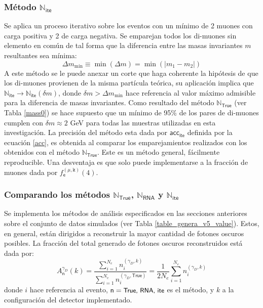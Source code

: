 \subsubsection{Método $\mathbb{N}_\textsf{ite}$}
 
Se aplica un proceso iterativo sobre los eventos con un mínimo de 2 muones con carga positiva y 2 de carga negativa. Se emparejan todos los di-muones sin elemento en común de tal forma que la diferencia entre las masas invariantes $m$ resultantes sea mínima:
\begin{equation}
\Delta m_{\min} \equiv \min{(\Delta m)}  = \min{(|m_1-m_2|)}
\end{equation}
A este método se le puede anexar un corte que haga coherente la hipótesis de que los di-muones provienen de la misma partícula teórica, su aplicación implica que $\mathbb{N}_\textsf{ite} \rightarrow \mathbb{N}_\textsf{ite}(\delta m)$, donde $\delta m > \Delta m_{\min}$ hace referencia al valor máximo admisible para la diferencia de masas invariantes. Como resultado del método $\mathbb{N}_\textsf{True}$ (ver Tabla \ref{mass0}) se hace supuesto que un mínimo de 95\% de los pares de di-muones cumplen con $\delta m \approx 2$ GeV para todas las muestras utilizadas en esta investigación. La precisión del método esta dada por $\textsf{acc}_\textsf{ite}$ definida por la ecuación \ref{acc}, es obtenida al comparar los emparejamientos realizados con los obtenidos con el método $\mathbb{N}_\textsf{True}$.
Este es un método general, fácilmente reproducible. %
Una desventaja es que solo puede implementarse  a la fracción de muones dada por $f^{(\mu, \texttt{k})}_\textsf{e} (4)$.


\subsubsection{Comparando los métodos $\mathbb{N}_\textsf{True}$, $\mathbb{N}_\textsf{RNA}$ y $\mathbb{N}_\textsf{ite}$}
Se implementa los métodos de análisis especificados en las secciones anteriores sobre el conjunto de datos simulados (ver Tabla \ref{table_genera_v5_value}). Estos, en general, están dirigidos a reconstruir la mayor cantidad de fotones oscuros posibles. La fracción del total generado de fotones oscuros reconstruidos está dada por:
\begin{equation}
A_\textsf{n}^{\gamma_D} (k) = \dfrac{\sum\limits_{i=1}^{N_e} n_i^{(\gamma_D,k)}}{\sum\limits_{i=1}^{N_e} n_i^{(\gamma_D,\textsf{True})}} = \dfrac{1}{2 N_e} \sum\limits_{i=1}^{N_e} n_i^{(\gamma_D,k)}
\end{equation}
donde $i$ hace referencia al evento, $\textsf{n} =\textsf{\small True, RNA, ite}$ es el método, y $k$ a la configuración del detector implementado. 


